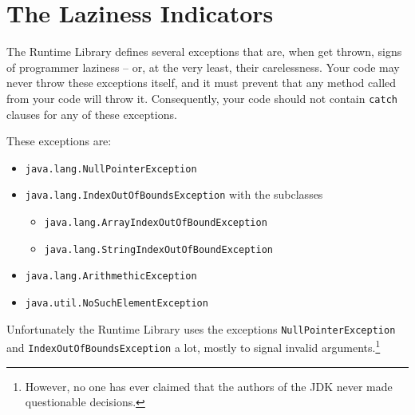 \section{The Laziness Indicators}\label{sec:LazinessIndicators}
The \Java Runtime Library defines several exceptions that are, when get thrown, signs of programmer laziness – or, at the very least, their carelessness. Your code may never throw these exceptions itself, and it must prevent that any method called from your code will throw it. Consequently, your code should not contain \lstinline|catch| clauses for any of these exceptions.

These exceptions are:
\begin{itemize}[nosep]
	\item{\lstinline|java.lang.NullPointerException| \autocite{ORACLE_DOC_NULLPOINTEREXCEPTION_CLASS}}
	\item{\lstinline|java.lang.IndexOutOfBoundsException| \autocite{ORACLE_DOC_INDEXOUTOFBOUNDSEXCEPTION_CLASS}
	with the subclasses
	\begin{itemize}[nosep]
		\item{\lstinline|java.lang.ArrayIndexOutOfBoundException| \autocite{ORACLE_DOC_ARRAYINDEXOUTOFBOUNDSEXCEPTION_CLASS}}
		\item{\lstinline|java.lang.StringIndexOutOfBoundException| \autocite{ORACLE_DOC_STRINGINDEXOUTOFBOUNDSEXCEPTION_CLASS}}
	\end{itemize}}
	\item{\lstinline|java.lang.ArithmethicException| \autocite{ORACLE_DOC_ARITHMETICEXCEPTION_CLASS}}
	\item{\lstinline|java.util.NoSuchElementException| \autocite{ORACLE_DOC_NOSUCHELEMENTEXCEPTION_CLASS}}
\end{itemize}

Unfortunately the \Java Runtime Library uses the exceptions \lstinline|NullPointerException| and \lstinline|IndexOutOfBoundsException| a lot, mostly to signal invalid arguments.\footnote{However, no one has ever claimed that the authors of the JDK never made questionable decisions.} 


